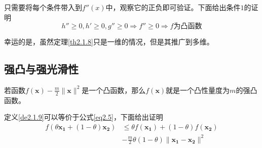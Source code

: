 \documentclass[lang=cn,10pt]{elegantbook}
\newcommand\bv[1]{\boldsymbol{#1}}
\begin{document}
只需要将每个条件带入到$f''(x)$中，观察它的正负即可验证。下面给出条件$1$的证明
\begin{equation*}
	h'' \geq 0, h' \geq 0, g'' \geq 0 \Rightarrow f'' \geq 0 \Rightarrow f\text{为凸函数}
\end{equation*}

幸运的是，虽然定理\ref{th2.1.8}只是一维的情况，但是其推广到多维。

\subsection*{强凸与强光滑性}
\begin{definition} \label{de2.1.9}
	若函数$f(\bv{x})-\frac{m}{2} \|\bv{x}\|^2$是一个凸函数，那么$f(\bv{x})$就是一个凸性量度为$m$的强凸函数。
\end{definition}

定义\ref{de2.1.9}可以等价于公式\ref{eq2.5}，下面给出证明
\begin{equation}
	\label{eq2.5}
	\begin{aligned}
		f(\theta \bv{x_1}+(1-\theta)\bv{x_2}) & \leqslant\theta f(\bv{x_1})+(1-\theta)f(\bv{x_2}) \\
		                                      & - \frac{m}{2}\theta(1-\theta)\|\bv{x_1-x_2}\|^2
	\end{aligned}
\end{equation}
\end{document}
